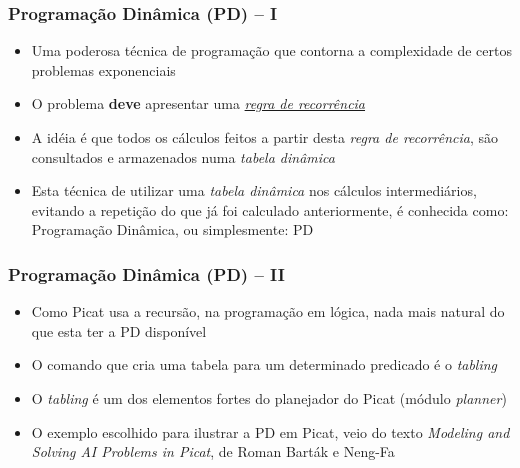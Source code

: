 \begin{frame}[fragile]

    \frametitle{Programação Dinâmica (PD) -- I}

   \begin{block}{}
     \begin{itemize}
      \item Uma poderosa técnica de programação que  contorna a complexidade de certos problemas
      exponenciais
      
       \pause
       \item O problema \textbf{deve} apresentar uma \textit{\underline{regra de recorrência}}
       
      \pause
      \item A idéia é que todos os cálculos feitos a partir desta \textit{regra de recorrência},
      são consultados e armazenados numa \textit{tabela dinâmica}
      
      \pause
      \item Esta técnica de utilizar uma \textit{tabela dinâmica} nos cálculos intermediários,
      evitando a repetição do que já foi calculado anteriormente, é conhecida como:
      Programação Dinâmica, ou simplesmente: PD

    \end{itemize}
    
    \end{block}
    
\end{frame}




\begin{frame}[fragile]

    \frametitle{Programação Dinâmica (PD) -- II}

   \begin{block}{}
     \begin{itemize}

      \item Como Picat usa a recursão, na programação em lógica, nada mais
      natural do que esta ter a PD disponível 

       \pause
       \item O comando que cria uma tabela para um determinado predicado é o  \textit{tabling}
 
        \pause
       \item O \textit{tabling}  é um dos elementos fortes do planejador do Picat (módulo \textit{planner})


        \pause
       \item O exemplo escolhido para ilustrar a PD em Picat, veio do texto \textit{Modeling and Solving AI
        Problems in Picat}, de Roman Barták e Neng-Fa
    \end{itemize}
    
    \end{block}
    
\end{frame}



